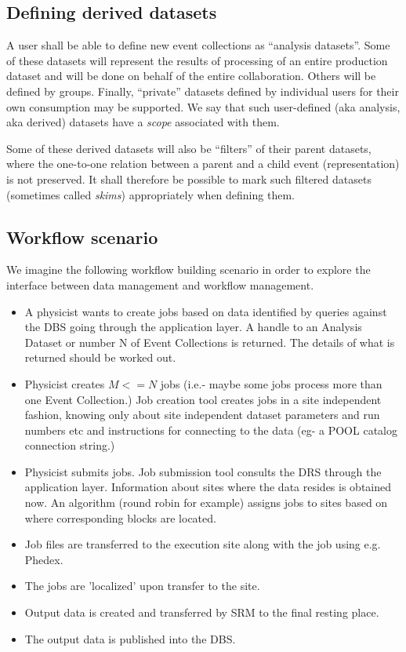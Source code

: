 \documentclass{cmspaper}
\begin{document}
\subsection{Defining derived datasets}

A user shall be able to define new event collections as ``analysis
datasets''. Some of these datasets will represent the results of processing
of an entire production dataset and will be done on behalf of the entire
collaboration. Others will be defined by groups. Finally, ``private''
datasets defined by individual users for their own consumption may be
supported. We say that such user-defined (aka analysis, aka derived)
datasets have a {\em scope} associated with them.

Some of these derived datasets will also be ``filters'' of their parent
datasets, where the one-to-one relation between a parent and a child
event (representation) is not preserved. It shall therefore be possible
to mark such filtered datasets (sometimes called {\em skims}) appropriately
when defining them.
 
\subsection{Workflow scenario}

We imagine the following workflow building scenario in order to explore the 
interface between data management and workflow management.

\begin{itemize}
\item A physicist wants to create jobs based on data identified by queries against 
the DBS going through the application layer.  A handle to an Analysis Dataset or number N of
Event Collections is returned.  The details of what is returned should be worked out.
\item Physicist creates $M <= N$ jobs (i.e.- maybe some jobs process 
more than one Event Collection.)  Job 
creation tool creates jobs in a site independent fashion, knowing only about site 
independent dataset parameters and run numbers etc and instructions for connecting to 
the data (eg- a POOL catalog connection string.)
\item Physicist submits jobs.  Job submission tool consults the DRS through the 
application layer.  Information about sites where the data resides is obtained 
now.  An algorithm (round robin for example) assigns jobs to sites based on where 
corresponding blocks are located.
\item Job files are transferred to the execution site along with the job using e.g. Phedex.
\item The jobs are 'localized' upon transfer to the site.
\item Output data is created and transferred by SRM to the final resting place.
\item The output data is published into the DBS.
\end{itemize}
\end{document}
